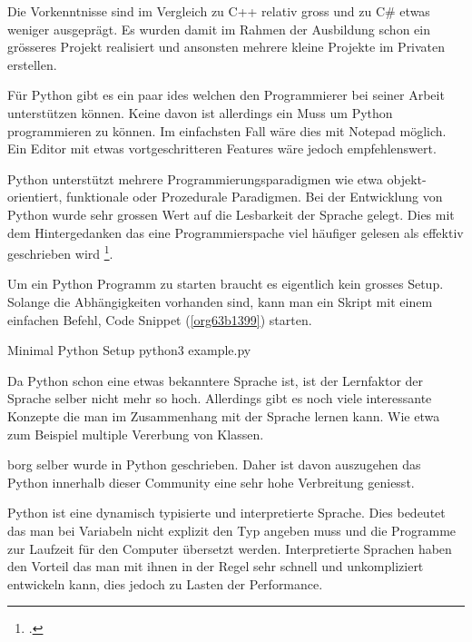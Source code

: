 Die Vorkenntnisse sind im Vergleich zu C++ relativ gross und zu C\# etwas
weniger ausgeprägt. Es wurden damit im Rahmen der Ausbildung schon ein
grösseres Projekt realisiert und ansonsten mehrere kleine Projekte im Privaten
erstellen.

Für Python gibt es ein paar \glspl{ide} welchen den Programmierer bei seiner
Arbeit unterstützen können. Keine davon ist allerdings ein Muss um Python
programmieren zu können. Im einfachsten Fall wäre dies mit Notepad möglich. Ein
Editor mit etwas vortgeschritteren Features wäre jedoch empfehlenswert.

Python unterstützt mehrere Programmierungsparadigmen wie etwa
objekt-orientiert, funktionale oder Prozedurale Paradigmen. Bei der Entwicklung
von Python wurde sehr grossen Wert auf die Lesbarkeit der Sprache gelegt. Dies
mit dem Hintergedanken das eine Programmierspache viel häufiger gelesen als
effektiv geschrieben wird \footcite{pep8}.

Um ein Python Programm zu starten braucht es eigentlich kein grosses Setup.
Solange die Abhängigkeiten vorhanden sind, kann man ein Skript mit einem
einfachen Befehl, Code Snippet (\ref{org63b1399}) starten.

\begin{sexylisting}{Minimal Python Setup}
python3 example.py
\end{sexylisting}

Da Python schon eine etwas bekanntere Sprache ist, ist der Lernfaktor der
Sprache selber nicht mehr so hoch. Allerdings gibt es noch viele interessante
Konzepte die man im Zusammenhang mit der Sprache lernen kann. Wie etwa zum
Beispiel multiple Vererbung von Klassen.

\gls{borg} selber wurde in Python geschrieben. Daher ist davon auszugehen das
Python innerhalb dieser Community eine sehr hohe Verbreitung geniesst.

Python ist eine dynamisch typisierte und interpretierte Sprache. Dies bedeutet
das man bei Variabeln nicht explizit den Typ angeben muss und die Programme zur
Laufzeit für den Computer übersetzt werden. Interpretierte Sprachen haben den
Vorteil das man mit ihnen in der Regel sehr schnell und unkompliziert
entwickeln kann, dies jedoch zu Lasten der Performance.


